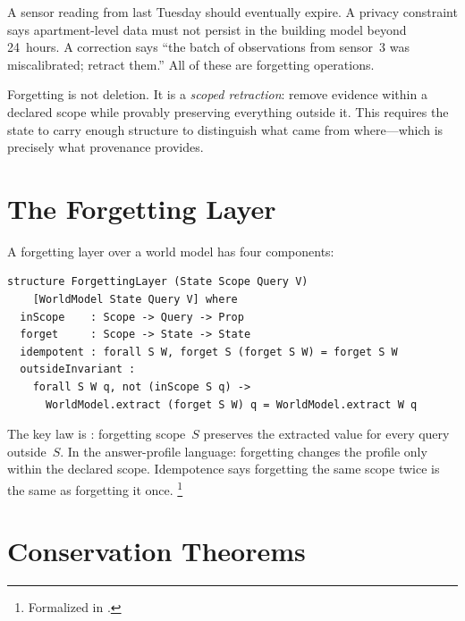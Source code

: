 \documentclass[11pt,openany]{report}
\begin{document}
A sensor reading from last Tuesday should eventually expire.  A privacy
constraint says apartment-level data must not persist in the building
model beyond 24~hours.  A correction says ``the batch of observations
from sensor~3 was miscalibrated; retract them.''  All of these are
forgetting operations.

Forgetting is not deletion.  It is a \emph{scoped retraction}: remove
evidence within a declared scope while provably preserving everything
outside it.  This requires the state to carry enough structure to
distinguish what came from where---which is precisely what provenance
provides.

\section{The Forgetting Layer}
\label{sec:forgetting}

A forgetting layer over a world model has four components:

\begin{lstlisting}[language={}]
structure ForgettingLayer (State Scope Query V)
    [WorldModel State Query V] where
  inScope    : Scope -> Query -> Prop
  forget     : Scope -> State -> State
  idempotent : forall S W, forget S (forget S W) = forget S W
  outsideInvariant :
    forall S W q, not (inScope S q) ->
      WorldModel.extract (forget S W) q = WorldModel.extract W q
\end{lstlisting}

\noindent
The key law is : forgetting scope~$S$ preserves
the extracted value for every query outside~$S$.  In the answer-profile
language: forgetting changes the profile only within the declared scope.
Idempotence says forgetting the same scope twice is the same as
forgetting it once.%
\footnote{Formalized in
.}



\section{Conservation Theorems}
\label{sec:conservation}
\end{document}

